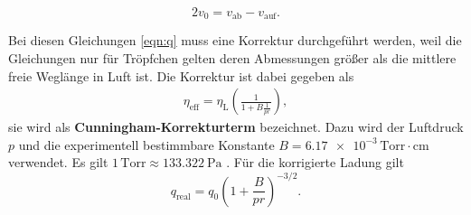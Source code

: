 \begin{equation}
    \label{eqn:v_0}
    2v_0 = v_\text{ab} - v_\text{auf}.
\end{equation}

Bei diesen Gleichungen \ref{eqn:q} muss eine Korrektur durchgeführt werden, weil die Gleichungen nur für Tröpfchen gelten deren Abmessungen größer 
als die mittlere freie Weglänge in Luft ist.
Die Korrektur ist dabei gegeben als
\begin{align}
\label{eq:Theorie_Cunningham_Viskositaet}
\eta_\text{eff}=\eta_\text{L}\left( \frac{1}{1+B\frac{1}{pr}} \right),
\end{align}
sie wird als \textbf{Cunningham-Korrekturterm} bezeichnet. 
Dazu wird der Luftdruck $p$ und die experimentell bestimmbare Konstante $B =  \num{6.17e-3}\, \text{Torr}\cdot\unit{\centi\metre}$ \cite{1} verwendet.
Es gilt $1\,\text{Torr} \approx \qty{133.322}{\pascal}$ \cite{2}.
Für die korrigierte Ladung gilt
\begin{equation}
    \label{eqn:q_korrigiert}
    q_\text{real} = q_0 \left(1+ \frac{B}{pr}\right)^{-3/2}.
\end{equation}